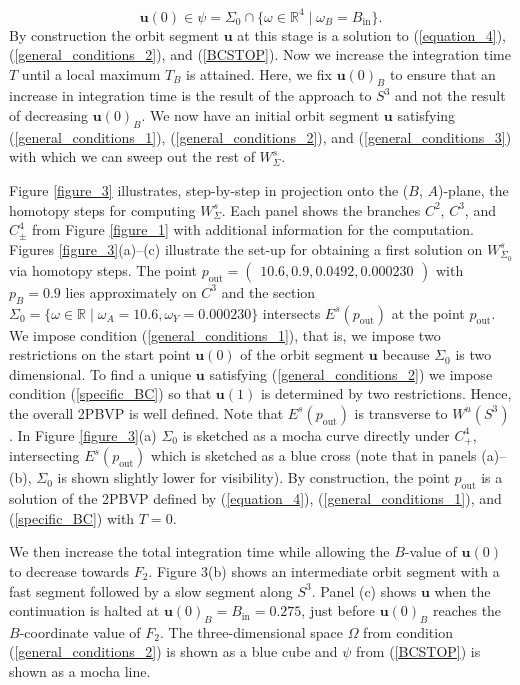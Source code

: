 \documentclass{ws-ijbc}
\begin{document}
\begin{equation}
	\mathbf{u}(0) \in \psi=\Sigma_{0} \cap \{ \omega \in \mathbb{R}^4 \; | \; \omega_B = B_{\text{in}} \}.
	\label{BCSTOP}
\end{equation}
By construction the orbit segment $\mathbf{u}$ at this stage is a solution to (\ref{equation_4}), (\ref{general_conditions_2}), and (\ref{BCSTOP}).  Now we increase the integration time $T$ until a local maximum $T_B$ is attained.  Here, we fix $\mathbf{u}(0)_B$ to ensure that an increase in integration time is the result of the approach to $S^3$ and not the result of decreasing $\mathbf{u}(0)_B$.  We now have an initial orbit segment $\mathbf{u}$ satisfying (\ref{general_conditions_1}), (\ref{general_conditions_2}), and (\ref{general_conditions_3}) with which we can sweep out the rest of $W^s_\Sigma$.

Figure \ref{figure_3} illustrates, step-by-step in projection onto the ($B$, $A$)-plane, the homotopy steps for computing $W^s_\Sigma$.  Each panel shows the branches $C^2$, $C^3$, and $C^4_\pm$ from Figure \ref{figure_1} with additional information for the computation.  Figures \ref{figure_3}(a)--(c) illustrate the set-up for obtaining a first solution on $W^s_{\Sigma_0}$ via homotopy steps.  The point $p_{\text{out}}=\begin{pmatrix} 10.6, 0.9, 0.0492, 0.000230 \end{pmatrix}$ with $p_B=0.9$ lies approximately on $C^3$ and the section $\Sigma_0=\{\omega \in \mathbb{R} \; | \;  \omega_A=10.6, \omega_Y=0.000230\}$ intersects $E^s(p_\text{out})$ at the point $p_{\text{out}}$.  We impose condition (\ref{general_conditions_1}), that is, we impose two restrictions on the start point $\mathbf{u}(0)$ of the orbit segment $\mathbf{u}$ because $\Sigma_0$ is two dimensional.  To find a unique $\mathbf{u}$ satisfying (\ref{general_conditions_2}) we impose condition (\ref{specific_BC}) so that $\mathbf{u}(1)$ is determined by two restrictions.  Hence, the overall 2PBVP is well defined.  Note that $E^s(p_{\text{out}})$ is transverse to $W^u(S^3)$.  In Figure \ref{figure_3}(a) $\Sigma_0$ is sketched as a mocha curve directly under $C^4_+$, intersecting $E^s(p_{\text{out}})$ which is sketched as a blue cross (note that in panels (a)--(b), $\Sigma_0$ is shown slightly lower for visibility).  By construction, the point $p_{\text{out}}$ is a solution of the 2PBVP defined by (\ref{equation_4}), (\ref{general_conditions_1}), and (\ref{specific_BC}) with $T=0$.

We then increase the total integration time while allowing the $B$-value of $\mathbf{u}(0)$ to decrease towards $F_2$.  Figure 3(b) shows an intermediate orbit segment with a fast segment followed by a slow segment along $S^3$.  Panel (c) shows $\mathbf{u}$ when the continuation is halted at $\mathbf{u}(0)_B = B_{\text{in}}=0.275$, just before $\mathbf{u}(0)_B$ reaches the $B$-coordinate value of $F_2$.  The three-dimensional space $\Omega$ from condition (\ref{general_conditions_2}) is shown as a blue cube and $\psi$ from (\ref{BCSTOP}) is shown as a mocha line.
    
\end{document}
